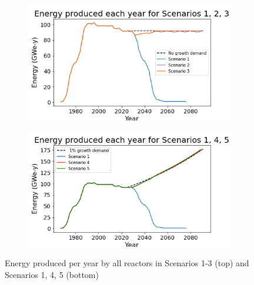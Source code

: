 \begin{frame}
\begin{columns}
        \column[t]{5cm}
        \vspace{-1cm}
        \begin{figure}
            \centering 
            \begin{subfigure}
                \centering
                \includegraphics[scale=0.3]{figures/energy_scenarios_123.png}
                \label{fig:energy_123}
            \end{subfigure}
            \vspace{-0.8cm}
            \begin{subfigure}
                \centering
                \includegraphics[scale=0.3]{figures/energy_scenarios_145.png}
                \label{fig:energy_145}
            \end{subfigure}
            \caption{Energy produced per year by all reactors in Scenarios 1-3 (top)
            and Scenarios 1, 4, 5 (bottom)}
            \label{fig:energy}
        \end{figure}
    \end{columns}
\end{frame}

